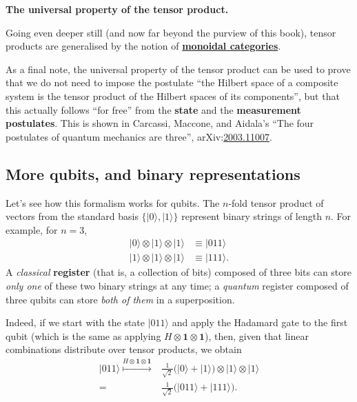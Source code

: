 \documentclass[fleqn,a4paper]{article}
\newenvironment{technical}[1]{\textbf{#1.}\par\vspace{.5\baselineskip}\everypar{\setlength{\parindent}{1.5em}}}{}
\theoremstyle{definition}
\theoremstyle{definition}
\theoremstyle{definition}
\theoremstyle{definition}
\theoremstyle{remark}
\begin{document}
\begin{technical}{The universal property of the tensor product}
Going even deeper still (and now far beyond the purview of this book), tensor products are generalised by the notion of \href{https://en.wikipedia.org/wiki/Monoidal_category}{\textbf{monoidal categories}}.

As a final note, the universal property of the tensor product can be used to prove that we do not need to impose the postulate ``the Hilbert space of a composite system is the tensor product of the Hilbert spaces of its components'', but that this actually follows ``for free'' from the \textbf{state} and the \textbf{measurement postulates}.
This is shown in Carcassi, Maccone, and Aidala's ``The four postulates of quantum mechanics are three'', arXiv:\href{https://arxiv.org/abs/2003.11007}{2003.11007}.

\end{technical}

\hypertarget{more-than-two-qubits-and-binary}{%
\subsection{More qubits, and binary representations}\label{more-than-two-qubits-and-binary}}

Let's see how this formalism works for qubits.
The \(n\)-fold tensor product of vectors from the standard basis \(\{|0\rangle,|1\rangle\}\) represent binary strings of length \(n\).
For example, for \(n=3\),
\[
  \begin{aligned}
    |0\rangle\otimes|1\rangle\otimes|1\rangle
    & \equiv |011\rangle
  \\|1\rangle\otimes|1\rangle\otimes|1\rangle
    & \equiv |111\rangle.
  \end{aligned}
\]
A \emph{classical} \textbf{register} (that is, a collection of bits) composed of three bits can store \emph{only one} of these two binary strings at any time; a \emph{quantum} register composed of three qubits can store \emph{both of them} in a superposition.

Indeed, if we start with the state \(|011\rangle\) and apply the Hadamard gate to the first qubit (which is the same as applying \(H\otimes\mathbf{1}\otimes\mathbf{1}\)), then, given that linear combinations distribute over tensor products, we obtain
\[
  \begin{aligned}
    |011\rangle
    \overset{H\otimes\mathbf{1}\otimes\mathbf{1}}{\longmapsto}
    &\frac{1}{\sqrt{2}} \big(|0\rangle + |1\rangle\big) \otimes|1\rangle\otimes|1\rangle
  \\=
    &\frac{1}{\sqrt{2}} \big(|011\rangle + |111\rangle\big).
  \end{aligned}
\]
\end{document}

